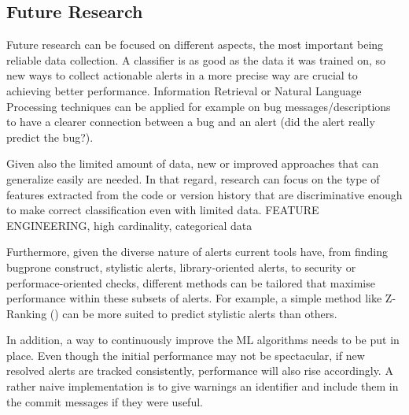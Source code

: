 \documentclass{article}
\begin{document}

\subsection{Future Research}


Future research can be focused on different aspects, the most important being reliable data collection. A classifier is as good as the data it was trained on, so new ways to collect actionable alerts in a more precise way are crucial to achieving better performance. Information Retrieval or Natural Language Processing techniques can be applied for example on bug messages/descriptions to have a clearer connection between a bug and an alert (did the alert really predict the bug?).

Given also the limited amount of data, new or improved approaches that can generalize easily are needed. In that regard, research can focus on the type of features extracted from the code or version history that are discriminative enough to make correct classification even with limited data. FEATURE ENGINEERING, high cardinality, categorical data

Furthermore, given the diverse nature of alerts current tools have, from finding bugprone construct, stylistic alerts, library-oriented alerts, to security or performace-oriented checks, different methods can be tailored that maximise performance within these subsets of alerts. For example, a simple method like Z-Ranking (\cite{z-ranking}) can be more suited to predict stylistic alerts than others.

In addition, a way to continuously improve the ML algorithms needs to be put in place. Even though the initial performance may not be spectacular, if new resolved alerts are tracked consistently, performance will also rise accordingly. A rather naive implementation is to give warnings an identifier and include them in the commit messages if they were useful.



\nocite{*}


\end{document}
